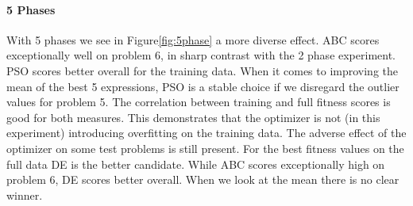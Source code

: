 \paragraph{5 Phases}
With 5 phases we see in Figure\ref{fig:5phase} a more diverse effect. ABC scores exceptionally well on problem 6, in sharp contrast with the 2 phase experiment. PSO scores better overall for the training data. When it comes to improving the mean of the best 5 expressions, PSO is a stable choice if we disregard the outlier values for problem 5. The correlation between training and full fitness scores is good for both measures. This demonstrates that the optimizer is not (in this experiment) introducing overfitting on the training data. The adverse effect of the optimizer on some test problems is still present. For the best fitness values on the full data DE is the better candidate. While ABC scores exceptionally high on problem 6, DE scores better overall. When we look at the mean there is no clear winner. 
